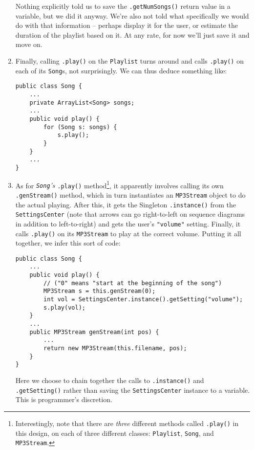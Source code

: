 \begin{enumerate}
Nothing explicitly told us to save the \texttt{.getNumSongs()} return value in
a variable, but we did it anyway. We're also not told what specifically we
would do with that information -- perhaps display it for the user, or estimate
the duration of the playlist based on it. At any rate, for now we'll just save
it and move on.

\item Finally, calling \texttt{.play()} on the \texttt{Playlist} turns around
and calls \texttt{.play()} on each of its \texttt{Song}s, not surprisingly. We
can thus deduce something like:

\begin{Verbatim}[fontsize=\footnotesize,samepage=true,frame=single]
public class Song {
    ...
    private ArrayList<Song> songs;
    ...
    public void play() {
        for (Song s: songs) {
            s.play();
        }         
    }
    ...
}
\end{Verbatim}

\item As for \textit{\texttt{Song}'s} \texttt{.play()}
method\footnote{Interestingly, note that there are \textit{three} different
methods called \texttt{.play()} in this design, on each of three different
classes: \texttt{Playlist}, \texttt{Song}, and \texttt{MP3Stream}.}, it
apparently involves calling its own \texttt{.genStream()} method, which in
turn instantiates an \texttt{MP3Stream} object to do the actual playing. After
this, it gets the Singleton \texttt{.instance()} from the
\texttt{SettingsCenter} (note that arrows can go right-to-left on sequence
diagrams in addition to left-to-right) and gets the user's \texttt{"volume"}
setting. Finally, it calls \texttt{.play()} on its \texttt{MP3Stream} to play
at the correct volume. Putting it all together, we infer this sort of code:

\begin{Verbatim}[fontsize=\scriptsize,samepage=true,frame=single]
public class Song {
    ...
    public void play() {
        // ("0" means "start at the beginning of the song")
        MP3Stream s = this.genStream(0);  
        int vol = SettingsCenter.instance().getSetting("volume");
        s.play(vol);
    }
    ...
    public MP3Stream genStream(int pos) {
        ...
        return new MP3Stream(this.filename, pos);
    }
}
\end{Verbatim}

Here we choose to chain together the calls to \texttt{.instance()} and
\texttt{.getSetting()} rather than saving the \texttt{SettingsCenter} instance
to a variable. This is programmer's discretion. 



\end{enumerate}

